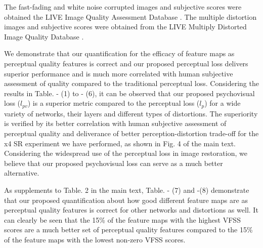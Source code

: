 \documentclass[10pt,twocolumn,letterpaper]{article}
\begin{document}
The fast-fading and white noise corrupted images and subjective scores were obtained the LIVE Image Quality Assessment Database \cite{4}. The multiple distortion images and subjective scores were obtained from the LIVE Multiply Distorted Image Quality Database \cite{36}.

We demonstrate that our quantification for the efficacy of feature maps as perceptual quality features is correct and our proposed perceptual loss delivers superior performance and is much more correlated with human subjective assessment of quality compared to the traditional perceptual loss. Considering the results in Table. - (1) to - (6), it can be observed that our proposed psychovisual loss (\textbf{$l_{pv}$}) is a superior metric compared to the perceptual loss (\textbf{$l_{p}$}) for a wide variety of networks, their layers and different types of distortions. The superiority is verified by its better correlation with human subjective assessment of perceptual quality and deliverance of better perception-distortion trade-off for the x4 SR experiment we have performed, as shown in Fig. 4 of the main text. Considering the widespread use of the perceptual loss in image restoration, we believe that our proposed psychovisual loss can serve as a much better alternative.

As supplements to Table. 2 in the main text, Table. - (7) and -(8) demonstrate that our proposed quantification about how good different feature maps are as perceptual quality features is correct for other networks and distortions as well. It can clearly be seen that the 15\% of the feature maps with the highest VFSS scores are a much better set of perceptual quality features compared to the 15\% of the feature maps with the lowest non-zero VFSS scores.
\end{document}
